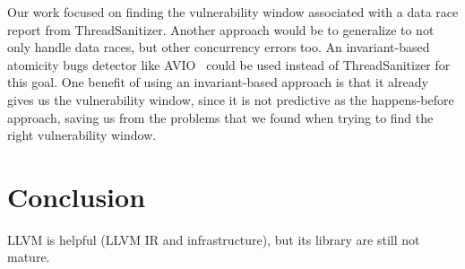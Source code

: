 \documentclass{acm_proc_article-sp}
\begin{document}
Our work focused on finding the vulnerability window associated with a data race report from ThreadSanitizer. Another approach would be to generalize to not only handle data races, but other concurrency errors too. An invariant-based atomicity bugs detector like AVIO~\cite{lu2006avio} could be used instead of ThreadSanitizer for this goal. One benefit of using an invariant-based approach is that it already gives us the vulnerability window, since it is not predictive as the happens-before approach, saving us from the problems that we found when trying to find the right vulnerability window. 

\section{Conclusion}

LLVM is helpful (LLVM IR and infrastructure), but its library are still not mature.
\end{document}
